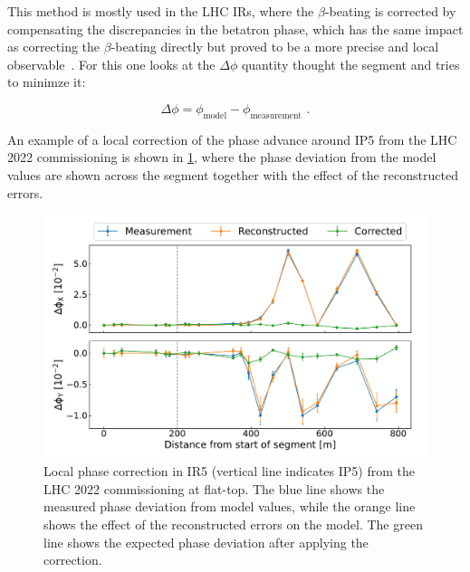 This method is mostly used in the LHC IRs, where the \(\beta\)-beating is corrected by compensating the discrepancies in the betatron phase, which has the same impact as correcting the \(\beta\)-beating directly but proved to be a more precise and local observable~\cite{PRAB:Tomas:CERN_LHC_OMC}.
For this one looks at the \(\Delta \phi\) quantity thought the segment and tries to minimze it:

\begin{equation}
  \Delta \phi = \phi_{\mathrm{model}} - \phi_{\mathrm{measurement}} \text{ .}
  \label{equation:sbs_delta_phi}
\end{equation}

An example of a local correction of the phase advance around IP\num{5} from the LHC \num{2022} commissioning is shown in \cref{figure:example_sbs_correction}, where the phase deviation from the model values are shown across the segment together with the effect of the reconstructed errors.

\begin{figure}[!hbt]
  \centering
  \includegraphics*[width=0.99\linewidth]{Figures/Optics_Measurements_Corrections_at_LHC/sbs_phase_ip5_example.pdf}
  \caption{Local phase correction in IR\num{5} (vertical line indicates IP\num{5}) from the LHC \num{2022} commissioning at flat-top. The \textcolor{mplblue}{blue} line shows the measured phase deviation from model values, while the \textcolor{mplorange}{orange} line shows the effect of the reconstructed errors on the model. The \textcolor{mplgreen}{green} line shows the expected phase deviation after applying the correction.}
  \label{figure:example_sbs_correction}
\end{figure}

